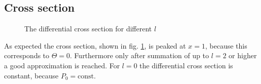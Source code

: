 \documentclass{scrartcl}
\begin{document}
\subsection{Cross section}

\begin{figure}[htbp]
	
	\caption{The differential cross section for different $l$}
	\label{fig:crossect}
\end{figure}
As expected the cross section, shown in fig. \ref{fig:crossect}, is peaked at $x=1$, because this corresponds to $\Theta=0$. Furthermore only after summation of up to $l=2$ or higher a good approximation is reached. For $l=0$ the differential cross section is constant, because $P_0=\text{const}$.
\newpage
\listoffigures
\listoftables
\printbibliography
\end{document}
